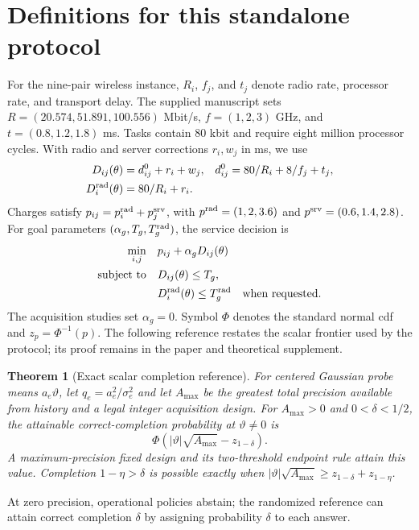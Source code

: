 \documentclass[11pt,a4paper]{article}
\newtheorem{theorem}{Theorem}
\begin{document}
\section*{Definitions for this standalone protocol}
For the nine-pair wireless instance, $R_i$, $f_j$, and $t_j$ denote radio rate, processor rate, and transport delay. The supplied manuscript sets $R=(20.574,51.891,100.556)$ Mbit/s, $f=(1,2,3)$ GHz, and $t=(0.8,1.2,1.8)$ ms. Tasks contain 80 kbit and require eight million processor cycles. With radio and server corrections $r_i,w_j$ in ms, we use
\begin{equation}
\begin{aligned}
D_{ij}(\theta)&=d^0_{ij}+r_i+w_j, &d^0_{ij}&=80/R_i+8/f_j+t_j,\\
D_i^{\rm rad}(\theta)&=80/R_i+r_i.
\end{aligned}
\label{eq:wireless-delay}
\end{equation}
Charges satisfy $p_{ij}=p_i^{\rm rad}+p_j^{\rm srv}$, with $p^{\rm rad}=(1,2,3.6)$ and $p^{\rm srv}=(0.6,1.4,2.8)$. For goal parameters $(\alpha_g,T_g,T_g^{\rm rad})$, the service decision is
\begin{equation}
\begin{aligned}
\min_{i,j}\quad &p_{ij}+\alpha_g D_{ij}(\theta)\\
\text{subject to}\quad &D_{ij}(\theta)\leq T_g,\\
&D_i^{\rm rad}(\theta)\leq T_g^{\rm rad}\quad\text{when requested}.
\end{aligned}
\label{eq:wireless-instance}
\end{equation}
The acquisition studies set $\alpha_g=0$. Symbol $\Phi$ denotes the standard normal cdf and $z_p=\Phi^{-1}(p)$. The following reference restates the scalar frontier used by the protocol; its proof remains in the paper and theoretical supplement.
\begin{theorem}[Exact scalar completion reference]
\label{thm:scalar-deadline}
For centered Gaussian probe means $a_e\vartheta$, let $q_e=a_e^2/\sigma_e^2$ and let $A_{\max}$ be the greatest total precision available from history and a legal integer acquisition design. For $A_{\max}>0$ and $0<\delta<1/2$, the attainable correct-completion probability at $\vartheta\ne0$ is
$$\Phi\!\left(|\vartheta|\sqrt{A_{\max}}-z_{1-\delta}\right).$$
A maximum-precision fixed design and its two-threshold endpoint rule attain this value. Completion $1-\eta>\delta$ is possible exactly when $|\vartheta|\sqrt{A_{\max}}\geq z_{1-\delta}+z_{1-\eta}$.
\end{theorem}
At zero precision, operational policies abstain; the randomized reference can attain correct completion $\delta$ by assigning probability $\delta$ to each answer.
\end{document}
